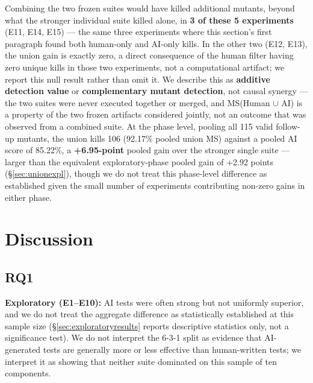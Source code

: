 \documentclass[10pt,conference]{IEEEtran}
\begin{document}
Combining the two frozen suites would have killed additional mutants, beyond what the stronger individual suite killed alone, in \textbf{3 of these 5 experiments} (E11, E14, E15) — the same three experiments where this section's first paragraph found both human-only and AI-only kills. In the other two (E12, E13), the union gain is exactly zero, a direct consequence of the human filter having zero unique kills in those two experiments, not a computational artifact; we report this null result rather than omit it. We describe this as \textbf{additive detection value} or \textbf{complementary mutant detection}, not causal synergy — the two suites were never executed together or merged, and MS(Human $\cup$ AI) is a property of the two frozen artifacts considered jointly, not an outcome that was observed from a combined suite. At the phase level, pooling all 115 valid follow-up mutants, the union kills 106 (92.17\% pooled union MS) against a pooled AI score of 85.22\%, a \textbf{+6.95-point} pooled gain over the stronger single suite — larger than the equivalent exploratory-phase pooled gain of +2.92 points (\S\ref{sec:unionexpl}), though we do not treat this phase-level difference as established given the small number of experiments contributing non-zero gains in either phase.

\section{Discussion}
\label{sec:discussion}

\subsection{RQ1}
\textbf{Exploratory (E1--E10):} AI tests were often strong but not uniformly superior, and we do not treat the aggregate difference as statistically established at this sample size (\S\ref{sec:exploratoryresults} reports descriptive statistics only, not a significance test). We do not interpret the 6-3-1 split as evidence that AI-generated tests are generally more or less effective than human-written tests; we interpret it as showing that neither suite dominated on this sample of ten components.
\end{document}

